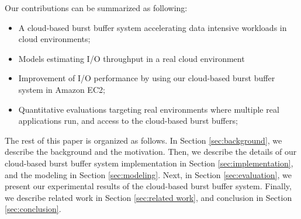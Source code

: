 Our contributions can be summarized as following:
\begin{itemize}
	\item A cloud-based burst buffer system accelerating data intensive
	workloads in cloud environments;
	\item Models estimating I/O throughput in a real cloud environment
	\item Improvement of I/O performance by using our cloud-based burst buffer
	system in Amazon EC2;
    \item Quantitative evaluations targeting real environments where
    multiple real applications run, and access to the cloud-based burst
    buffers;
\end{itemize}
\par
The rest of this paper is organized as follows. 
In Section \ref{sec:background}, we describe the background and the motivation.
Then, we describe the details of our cloud-based burst buffer system
implementation in Section \ref{sec:implementation}, and the modeling in Section
\ref{sec:modeling}. Next, in Section \ref{sec:evaluation}, we present our experimental results of the cloud-based burst buffer system.
Finally, we describe related work in Section \ref{sec:related work}, and
conclusion in Section \ref{sec:conclusion}.

